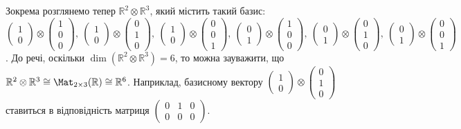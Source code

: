 \documentclass{math_library}
\begin{document}
\begin{example}
Зокрема розглянемо тепер $\mathbb{R}^2 \otimes \mathbb{R}^3$, який містить такий базис: $\begin{pmatrix}
1 \\ 0
\end{pmatrix} \otimes \begin{pmatrix}
1 \\ 0 \\ 0
\end{pmatrix},\ \begin{pmatrix}
1 \\ 0
\end{pmatrix} \otimes \begin{pmatrix}
0 \\ 1 \\ 0
\end{pmatrix},\ \begin{pmatrix}
1 \\ 0
\end{pmatrix} \otimes \begin{pmatrix}
0 \\ 0 \\ 1
\end{pmatrix},\ \begin{pmatrix}
0 \\ 1
\end{pmatrix} \otimes \begin{pmatrix}
1 \\ 0 \\ 0
\end{pmatrix},\ \begin{pmatrix}
0 \\ 1
\end{pmatrix} \otimes \begin{pmatrix}
0 \\ 1 \\ 0
\end{pmatrix},\ \begin{pmatrix}
0 \\ 1
\end{pmatrix} \otimes \begin{pmatrix}
0 \\ 0 \\ 1
\end{pmatrix}$. До речі, оскільки $\dim (\mathbb{R}^2 \otimes \mathbb{R}^3) = 6$, то можна зауважити, що $\mathbb{R}^2 \otimes \mathbb{R}^3 \cong \Mat_{2 \times 3}(\mathbb{R}) \cong \mathbb{R}^6$. Наприклад, базисному вектору $\begin{pmatrix}
1 \\ 0
\end{pmatrix} \otimes \begin{pmatrix}
0 \\ 1 \\ 0
\end{pmatrix}$ ставиться в відповідність матриця $\begin{pmatrix}
0 & 1 & 0 \\
0 & 0 & 0
\end{pmatrix}$.
\end{example}
\fi
\end{document}

